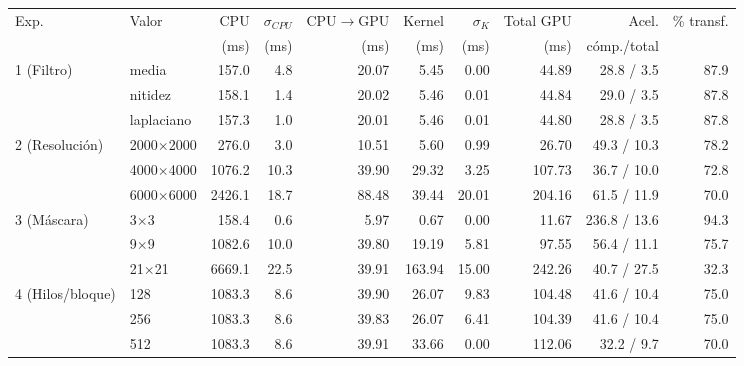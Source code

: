 \begin{tabular}{llrrrrrrrr}
\toprule
Exp. & Valor & CPU & $\sigma_{CPU}$ & CPU$\to$GPU & Kernel & $\sigma_{K}$ & Total GPU & Acel. & \% transf. \\
 & & (ms) & (ms) & (ms) & (ms) & (ms) & (ms) & cómp./total & \\
\midrule
1 (Filtro) & media & 157.0 & 4.8 & 20.07 & 5.45 & 0.00 & 44.89 & 28.8 / 3.5 & 87.9 \\
 & nitidez & 158.1 & 1.4 & 20.02 & 5.46 & 0.01 & 44.84 & 29.0 / 3.5 & 87.8 \\
 & laplaciano & 157.3 & 1.0 & 20.01 & 5.46 & 0.01 & 44.80 & 28.8 / 3.5 & 87.8 \\
\midrule
2 (Resolución) & 2000$\times$2000 & 276.0 & 3.0 & 10.51 & 5.60 & 0.99 & 26.70 & 49.3 / 10.3 & 78.2 \\
 & 4000$\times$4000 & 1076.2 & 10.3 & 39.90 & 29.32 & 3.25 & 107.73 & 36.7 / 10.0 & 72.8 \\
 & 6000$\times$6000 & 2426.1 & 18.7 & 88.48 & 39.44 & 20.01 & 204.16 & 61.5 / 11.9 & 70.0 \\
\midrule
3 (Máscara) & 3$\times$3 & 158.4 & 0.6 & 5.97 & 0.67 & 0.00 & 11.67 & 236.8 / 13.6 & 94.3 \\
 & 9$\times$9 & 1082.6 & 10.0 & 39.80 & 19.19 & 5.81 & 97.55 & 56.4 / 11.1 & 75.7 \\
 & 21$\times$21 & 6669.1 & 22.5 & 39.91 & 163.94 & 15.00 & 242.26 & 40.7 / 27.5 & 32.3 \\
\midrule
4 (Hilos/bloque) & 128 & 1083.3 & 8.6 & 39.90 & 26.07 & 9.83 & 104.48 & 41.6 / 10.4 & 75.0 \\
 & 256 & 1083.3 & 8.6 & 39.83 & 26.07 & 6.41 & 104.39 & 41.6 / 10.4 & 75.0 \\
 & 512 & 1083.3 & 8.6 & 39.91 & 33.66 & 0.00 & 112.06 & 32.2 / 9.7 & 70.0 \\
\bottomrule
\end{tabular}
